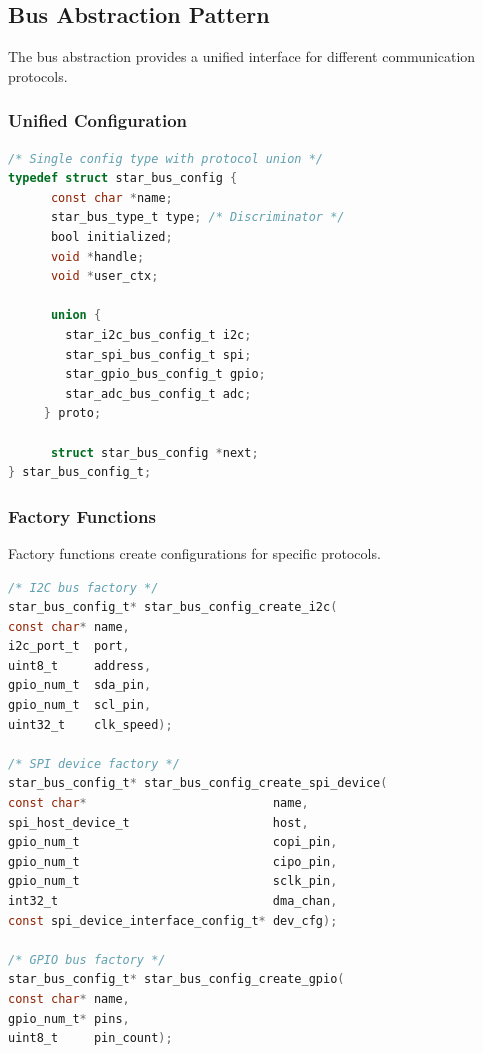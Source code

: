 \subsection{Bus Abstraction Pattern}

The bus abstraction provides a unified interface for different communication protocols.

\subsubsection{Unified Configuration}

\begin{lstlisting}[language=C]
/* Single config type with protocol union */
typedef struct star_bus_config {
      const char *name;
      star_bus_type_t type; /* Discriminator */
      bool initialized;
      void *handle;
      void *user_ctx;

      union {
        star_i2c_bus_config_t i2c;
        star_spi_bus_config_t spi;
        star_gpio_bus_config_t gpio;
        star_adc_bus_config_t adc;
     } proto;

      struct star_bus_config *next;
} star_bus_config_t;
\end{lstlisting}

\subsubsection{Factory Functions}

Factory functions create configurations for specific protocols.

\begin{lstlisting}[language=C]
/* I2C bus factory */
star_bus_config_t* star_bus_config_create_i2c(
const char* name,
i2c_port_t  port,
uint8_t     address,
gpio_num_t  sda_pin,
gpio_num_t  scl_pin,
uint32_t    clk_speed);

/* SPI device factory */
star_bus_config_t* star_bus_config_create_spi_device(
const char*                          name,
spi_host_device_t                    host,
gpio_num_t                           copi_pin,
gpio_num_t                           cipo_pin,
gpio_num_t                           sclk_pin,
int32_t                              dma_chan,
const spi_device_interface_config_t* dev_cfg);

/* GPIO bus factory */
star_bus_config_t* star_bus_config_create_gpio(
const char* name,
gpio_num_t* pins,
uint8_t     pin_count);
\end{lstlisting}


